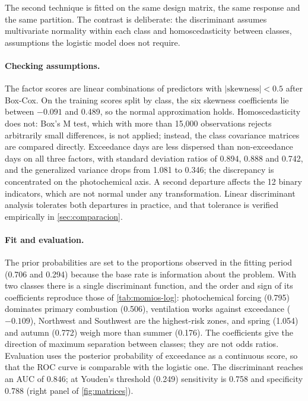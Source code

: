 The second technique is fitted on the same design matrix, the same response
and the same partition. The contrast is deliberate: the discriminant assumes
multivariate normality within each class and homoscedasticity between
classes, assumptions the logistic model does not require.

\paragraph{Checking assumptions.} The factor scores are linear combinations
of predictors with $|\text{skewness}|<0.5$ after Box-Cox. On the training
scores split by class, the six skewness coefficients lie between $-0.091$
and 0.489, so the normal approximation holds. Homoscedasticity does not: Box's
M test, which with more than 15,000 observations rejects arbitrarily small
differences, is not applied; instead, the class covariance matrices are
compared directly. Exceedance days are less dispersed than non-exceedance
days on all three factors, with standard deviation ratios of 0.894, 0.888
and 0.742, and the generalized variance drops from 1.081 to 0.346; the
discrepancy is concentrated on the photochemical axis. A second departure
affects the 12 binary indicators, which are not normal under any
transformation. Linear discriminant analysis tolerates both departures in
practice, and that tolerance is verified empirically in
\cref{sec:comparacion}.

\paragraph{Fit and evaluation.} The prior probabilities are set to the
proportions observed in the fitting period (0.706 and 0.294) because the base
rate is information about the problem. With two classes there is a single
discriminant function, and the order and sign of its coefficients reproduce
those of \cref{tab:momios-log}: photochemical forcing (0.795) dominates
primary combustion (0.506), ventilation works against exceedance ($-0.109$),
Northwest and Southwest are the highest-risk zones, and spring (1.054) and
autumn (0.772) weigh more than summer (0.176). The coefficients give the
direction of maximum separation between classes; they are not odds ratios.
Evaluation uses the posterior probability of exceedance as a continuous
score, so that the ROC curve is comparable with the logistic one. The
discriminant reaches an AUC of 0.846; at Youden's threshold (0.249)
sensitivity is 0.758 and specificity 0.788 (right panel of
\cref{fig:matrices}).

